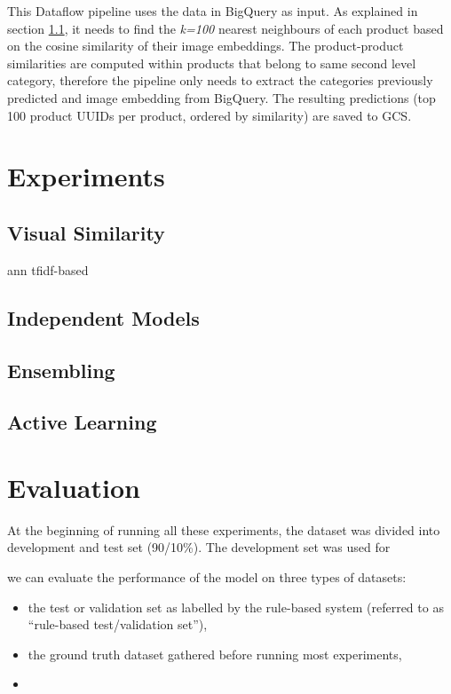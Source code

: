 
This Dataflow pipeline uses the data in BigQuery as input.
As explained in section \ref{exp_sim}, it needs to find the \textit{k=100} nearest neighbours of each product based on the cosine similarity of their image embeddings.
The product-product  similarities are computed within products that belong to same second level category,  therefore the pipeline only needs to extract  the categories previously predicted and image embedding from BigQuery.
The resulting predictions (top 100 product UUIDs per product, ordered by  similarity)  are saved to GCS.

\section{Experiments}

\subsection{Visual Similarity}
\label{exp_sim}

ann
tfidf-based

\subsection{Independent Models}
\label{exp_models}

\subsection{Ensembling}
\label{exp_ensembling}

\subsection{Active Learning}
\label{exp_al}


\section{Evaluation}
\label{evaluation}

At the beginning of running all these experiments, the dataset was divided into development and test set (90/10\%).
The development set was used for


 we can evaluate the performance of the model on three types of datasets:

\begin{itemize}
  \item the test or validation set as labelled by the rule-based system (referred to as ``rule-based test/validation set''),
  \item the ground truth dataset gathered  before running most experiments,
  \item
\end{itemize}
